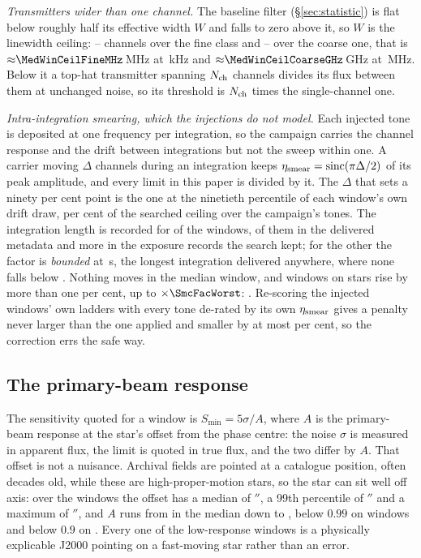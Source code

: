 \emph{Transmitters wider than one channel.} The baseline filter
(\S\ref{sec:statistic}) is flat below roughly half its effective width $W$ and
falls to zero above it, so $W$ is the linewidth ceiling:
\MedWinFineLo--\MedWinFineHi{} channels over the fine class and
\MedWinCoarseLo--\MedWinCoarseHi{} over the coarse one, that is
${\approx}\MedWinCeilFineMHz$\,MHz at \ChanFineKHz\,kHz and
${\approx}\MedWinCeilCoarseGHz$\,GHz at \ChanCoarseMHz\,MHz. Below it a
top-hat transmitter spanning $N_{\rm ch}$ channels divides its flux between
them at unchanged noise, so its threshold is $N_{\rm ch}$ times the
single-channel one.

\emph{Intra-integration smearing, which the injections do not model.} Each
injected tone is deposited at one frequency per integration, so the campaign
carries the channel response and the drift between integrations but not the
sweep within one. A carrier moving $\Delta$ channels during an integration
keeps $\eta_{\rm smear}=\mathrm{sinc}(\pi\Delta/2)$ of its peak amplitude, and
every limit in this paper is divided by it. The $\Delta$ that sets a ninety
per cent point is the one at the ninetieth percentile of each window's own
drift draw, \SmcQninePct{} per cent of the searched ceiling over the
campaign's \SmcNTone{} tones. The integration length is recorded for
\SmcNMeas{} of the \NWindows{} windows, \CsNDumpWin{} of them in the delivered
metadata and \SmNRecov{} more in the exposure records the search kept; for the
other \SmcNBound{} the factor is \emph{bounded} at \SmcDtCeil\,s, the longest
integration delivered anywhere, where none falls below \SmcBoundEta.
Nothing moves in the median window, and \SmcNAbove{} windows on
\SmcNAboveStar{} stars rise by more than one per cent, up to
$\times\SmcFacWorst$: \SmcAboveStars. Re-scoring the \SmcValNWin{} injected
windows' own ladders with every tone de-rated by its own $\eta_{\rm smear}$
gives a penalty never larger than the one applied and smaller by at most
\SmcValWorstPct{} per cent, so the correction errs the safe way.

\subsection{The primary-beam response}

The sensitivity quoted for a window is $S_{\min}=5\sigma/A$, where $A$ is the
primary-beam response at the star's offset from the phase centre: the noise
$\sigma$ is measured in apparent flux, the limit is quoted in true flux, and
the two differ by $A$. That offset is not a nuisance. Archival fields are
pointed at a catalogue position, often decades old, while these are
high-proper-motion stars, so the star can sit well off axis: over the
\PbNWin{} windows the offset has a median of \PbOffMed$''$, a 99th
percentile of \PbOffPNN$''$ and a maximum of \BmOffMax$''$, and $A$ runs from
\BmRespMed{} in the median down to \BmRespMin, below $0.99$ on
\PbNLowNN{} windows and below $0.9$ on \BmNBelowNine. Every one
of the low-response windows is a physically explicable J2000 pointing on a
fast-moving star rather than an error.


